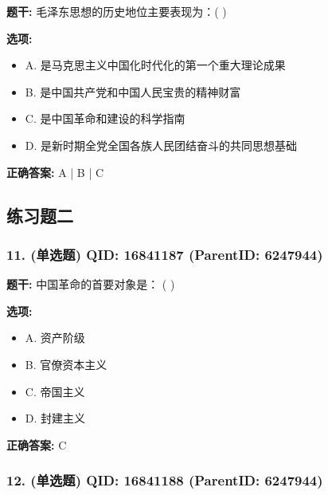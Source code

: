 \documentclass[12pt,UTF8]{ctexart}
\begin{document}
\textbf{题干:}
毛泽东思想的历史地位主要表现为：( )



\textbf{选项:}
\begin{itemize}[leftmargin=*]

  \item A. 是马克思主义中国化时代化的第一个重大理论成果

  \item B. 是中国共产党和中国人民宝贵的精神财富

  \item C. 是中国革命和建设的科学指南

  \item D. 是新时期全党全国各族人民团结奋斗的共同思想基础

\end{itemize}

\textbf{正确答案:}
A | B | C

\vspace{0.3em}\hrulefill\vspace{0.7em}

\subsection*{练习题二}

\subsubsection*{11. (单选题) \small QID: 16841187 (ParentID: 6247944)}

\textbf{题干:}
中国革命的首要对象是： ( )



\textbf{选项:}
\begin{itemize}[leftmargin=*]

  \item A. 资产阶级

  \item B. 官僚资本主义

  \item C. 帝国主义

  \item D. 封建主义

\end{itemize}

\textbf{正确答案:}
C

\vspace{0.3em}\hrulefill\vspace{0.7em}

\subsubsection*{12. (单选题) \small QID: 16841188 (ParentID: 6247944)}
\end{document}

